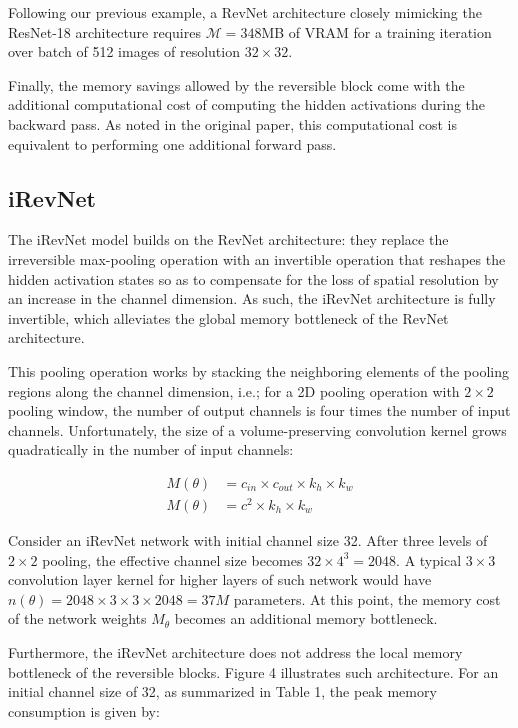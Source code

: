 \documentclass[twocolumn]{bmcart}
\begin{document}
Following our previous example, a RevNet architecture closely mimicking the ResNet-18 architecture
requires $\mathcal{M}=348$MB of VRAM for a training iteration over batch of 512 images of resolution $32 \times 32$.

Finally, the memory savings allowed by the reversible block come with the additional computational cost of computing the hidden activations during the backward pass.
As noted in the original paper, this computational cost is equivalent to performing one additional forward pass.

\subsection{iRevNet}

The iRevNet model builds on the RevNet architecture: they replace the irreversible max-pooling operation with an invertible operation that reshapes the hidden activation states
so as to compensate for the loss of spatial resolution by an increase in the channel dimension. 
As such, the iRevNet architecture is fully invertible, which alleviates the global memory bottleneck of the RevNet architecture.

This pooling operation works by stacking the neighboring elements of the pooling regions along the channel dimension, 
i.e.; for a 2D pooling operation with $2 \times 2$ pooling window, the number of output channels is four times the number of input channels. 
Unfortunately, the size of a volume-preserving convolution kernel grows quadratically in the number of input channels:

\begin{subequations}
\begin{align}
M(\theta) &= c_{in} \times c_{out} \times k_h \times k_w \\
M(\theta) &= c^2 \times k_h \times k_w
\end{align}
\end{subequations}

Consider an iRevNet network with initial channel size 32.
After three levels of $2 \times 2$ pooling, the effective channel size becomes $32 \times 4^3=2048$. A typical $3 \times 3$ convolution layer kernel for higher layers of such network would have $n(\theta)=2048 \times 3 \times 3 \times 2048=37M$ parameters.
At this point, the memory cost of the network weights $M_{\theta}$ becomes an additional memory bottleneck.

Furthermore, the iRevNet architecture does not address the local memory bottleneck of the reversible blocks.
Figure 4 illustrates such architecture. 
For an initial channel size of 32, as summarized in Table 1, the peak memory consumption is given by:
\end{document}
